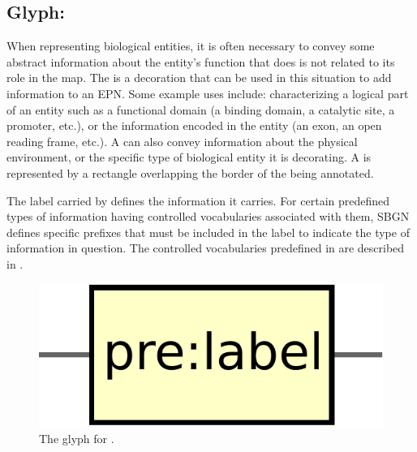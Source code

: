 \subsection{Glyph: }
\label{sec:unitInfo}

When representing biological entities, it is often necessary to convey some abstract information about the entity's function that does is not related to its role in the map.  The  is a decoration that can be used in this situation to add information to an EPN.  Some example uses include: characterizing a logical part of an entity such as a functional domain (a binding domain, a catalytic site, a promoter, etc.), or the information encoded in the entity (an exon, an open reading frame, etc.).  A  can also convey information about the physical environment, or the specific type of biological entity it is decorating. A  is represented by a rectangle overlapping the border of the  being annotated.

The label carried by  defines the information it carries.  For certain predefined types of information having controlled vocabularies associated with them, SBGN defines specific prefixes that must be included in the label to indicate the type of information in question.  The controlled vocabularies predefined in \SBGNPDLone are described in .

\begin{figure}[H]
  \centering
  \includegraphics[scale = 0.3]{images/unitInformation}
  \caption{The \PD glyph for .}
  \label{fig:unitInfo}
\end{figure}






